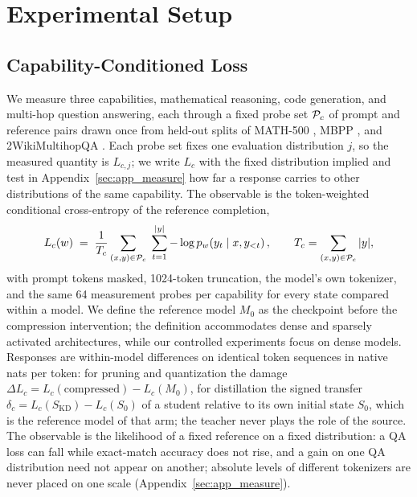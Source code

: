 \section{Experimental Setup}
\label{sec:setup}

\subsection{Capability-Conditioned Loss}
\label{sec:loss}

We measure three capabilities, mathematical reasoning, code
generation, and multi-hop question answering, each through a fixed
probe set $\mathcal{P}_{c}$ of prompt and reference pairs drawn once
from held-out splits of MATH-500
\citep{hendrycks2021math,lightman2023verify}, MBPP
\citep{austin2021program}, and 2WikiMultihopQA
\citep{ho2020constructing}. Each probe set fixes one evaluation distribution $j$, so the measured
quantity is $L_{c,j}$; we write $L_c$ with the fixed distribution
implied and test in Appendix~\ref{sec:app_measure} how far a response
carries to other distributions of the same capability. The observable is the
token-weighted conditional cross-entropy of the reference completion,
\begin{equation}
L_{c}(w)\;=\;\frac{1}{T_c}\sum_{(x,y)\in\mathcal{P}_{c}}\;\sum_{t=1}^{|y|}
-\log p_w\!\left(y_t\mid x,y_{<t}\right),\qquad
T_c=\sum_{(x,y)\in\mathcal{P}_{c}}|y|,
\label{eq:taskloss}
\end{equation}
with prompt tokens masked, 1024-token truncation, the model's own
tokenizer, and the same 64 measurement probes per capability for
every state compared within a model. We define the reference model $M_0$ as the checkpoint before the
compression intervention; the definition accommodates dense and
sparsely activated architectures, while our controlled experiments
focus on dense models. Responses are within-model differences on
identical token sequences in native nats per token: for pruning and
quantization the damage
$\Delta L_c=L_c(\text{compressed})-L_c(M_0)$, for distillation the
signed transfer $\delta_c=L_c(S_{\mathrm{KD}})-L_c(S_0)$ of a student
relative to its own initial state $S_0$, which is the reference
model of that arm; the teacher never plays the role of the source. The observable is the likelihood of a fixed reference on a fixed
distribution: a QA loss can fall while exact-match accuracy does not
rise, and a gain on one QA distribution need not appear on another;
absolute levels of different tokenizers are never placed on one scale
(Appendix~\ref{sec:app_measure}).

